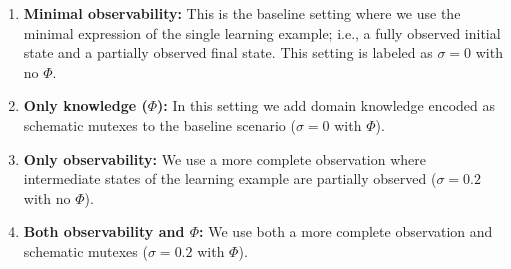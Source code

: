 \documentclass{article}
\begin{document}
\begin{enumerate}
	\item \textbf{Minimal observability:} This is the baseline setting where we use the minimal expression of the single learning example; i.e., a fully observed initial state and a partially observed final state. This setting is labeled as $\sigma = 0$ with no $\Phi$.
	\item \textbf{Only knowledge ($\Phi$):} In this setting we add domain knowledge encoded as schematic mutexes to the baseline scenario ($\sigma = 0$ with $\Phi$).
	\item \textbf{Only observability:} We use a more complete observation where intermediate states of the learning example are partially observed ($\sigma = 0.2$ with no $\Phi$).
	\item \textbf{Both observability and $\Phi$:} We use both a more complete observation and schematic mutexes ($\sigma = 0.2$ with $\Phi$).
\end{enumerate}
\end{document}
